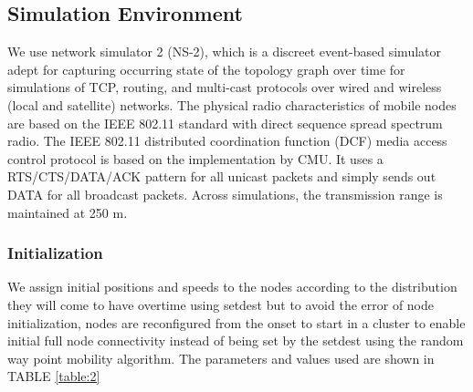 \documentclass[letterpaper, 10 pt, conference]{ieeeconf}  %
\begin{document}
\subsection{Simulation Environment}
We use network simulator 2 (NS-2), which is a discreet event-based simulator adept for capturing occurring state of the topology graph over time for simulations of TCP, routing, and multi-cast protocols over wired and wireless (local and satellite) networks. The physical radio characteristics of mobile nodes are based on the IEEE 802.11 standard with direct sequence spread spectrum radio. The IEEE 802.11 distributed coordination function (DCF) media access control protocol is based on the implementation by CMU. It uses a RTS/CTS/DATA/ACK pattern for all unicast packets and simply sends out DATA for all broadcast packets. Across simulations, the transmission range is maintained at 250 m.




\subsubsection{Initialization}
We assign initial positions and speeds to the nodes according to the distribution they will come to have overtime using setdest but to avoid the error of node initialization, nodes are reconfigured from the onset to start in a cluster to enable initial full node connectivity instead of being set by the setdest using the random way point mobility algorithm. The parameters and values used are shown in TABLE  \ref{table:2}
\end{document}
